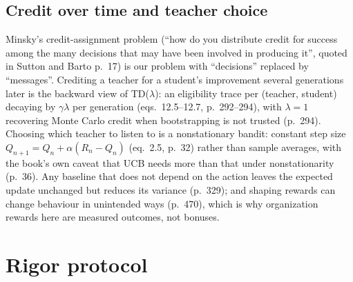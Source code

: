 \documentclass[11pt]{article}
\begin{document}
\subsection{Credit over time and teacher choice}

Minsky's credit-assignment problem (``how do you distribute credit for success among the many decisions that may
have been involved in producing it'', quoted in Sutton and Barto p.~17) is our problem with ``decisions'' replaced
by ``messages''. Crediting a teacher for a student's improvement several generations later is the backward view of
TD($\lambda$): an eligibility trace per (teacher, student) decaying by $\gamma\lambda$ per generation (eqs.~12.5--12.7,
p.~292--294), with $\lambda=1$ recovering Monte Carlo credit when bootstrapping is not trusted (p.~294). Choosing
which teacher to listen to is a nonstationary bandit: constant step size $Q_{n+1}=Q_n+\alpha(R_n-Q_n)$ (eq.~2.5,
p.~32) rather than sample averages, with the book's own caveat that UCB needs more than that under nonstationarity
(p.~36). Any baseline that does not depend on the action leaves the expected update unchanged but reduces its
variance (p.~329); and shaping rewards can change behaviour in unintended ways (p.~470), which is why organization
rewards here are measured outcomes, not bonuses.

\section{Rigor protocol}\label{sec:rigor}
\end{document}
